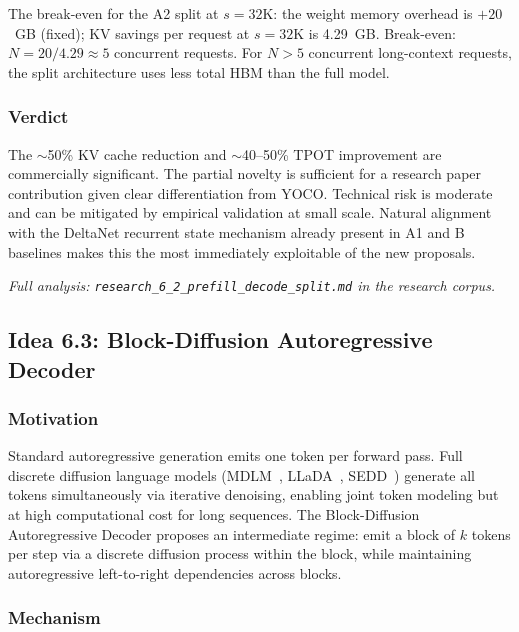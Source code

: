 \documentclass[11pt]{article}
\begin{document}
The break-even for the A2 split at $s = 32\text{K}$: the weight memory overhead is $+20$~GB (fixed); KV savings per request at $s = 32\text{K}$ is 4.29~GB. Break-even: $N = 20 / 4.29 \approx 5$ concurrent requests. For $N > 5$ concurrent long-context requests, the split architecture uses less total HBM than the full model.

\subsubsection*{Verdict}

The $\sim$50\% KV cache reduction and $\sim$40--50\% TPOT improvement are commercially significant. The partial novelty is sufficient for a research paper contribution given clear differentiation from YOCO. Technical risk is moderate and can be mitigated by empirical validation at small scale. Natural alignment with the DeltaNet recurrent state mechanism already present in A1 and B baselines makes this the most immediately exploitable of the new proposals.

\par\noindent\textit{Full analysis: \texttt{research\_6\_2\_prefill\_decode\_split.md} in the research corpus.}

\subsection{Idea 6.3: Block-Diffusion Autoregressive Decoder}
\label{sec:idea_6_3}

\subsubsection*{Motivation}

Standard autoregressive generation emits one token per forward pass. Full discrete diffusion language models (MDLM~\cite{sahoo2024mdlm}, LLaDA~\cite{nie2025llada}, SEDD~\cite{lou2024sedd}) generate all tokens simultaneously via iterative denoising, enabling joint token modeling but at high computational cost for long sequences. The Block-Diffusion Autoregressive Decoder proposes an intermediate regime: emit a block of $k$ tokens per step via a discrete diffusion process within the block, while maintaining autoregressive left-to-right dependencies across blocks.

\subsubsection*{Mechanism}
\end{document}
